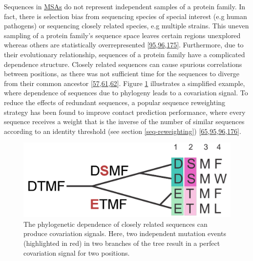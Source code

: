 \documentclass[11pt,a4paper,twoside]{book}
\theoremstyle{definition}
\theoremstyle{definition}
\theoremstyle{remark}
\begin{document}
Sequences in \protect\hyperlink{abbrev}{MSAs} do not represent
independent samples of a protein family. In fact, there is selection
bias from sequencing species of special interest (e.g human pathogens)
or sequencing closely related species, e.g multiple strains. This uneven
sampling of a protein family's sequence space leaves certain regions
unexplored whereas others are statistically overrepresented
{[}\protect\hyperlink{ref-Morcos2011}{95},\protect\hyperlink{ref-Cocco2017}{96},\protect\hyperlink{ref-Marks2012}{175}{]}.
Furthermore, due to their evolutionary relationship, sequences of a
protein family have a complicated dependence structure. Closely related
sequences can cause spurious correlations between positions, as there
was not sufficient time for the sequences to diverge from their common
ancestor
{[}\protect\hyperlink{ref-Gouveia_Oliveira2007}{57},\protect\hyperlink{ref-Lapedes1999}{61},\protect\hyperlink{ref-Burger2010}{62}{]}.
Figure \ref{fig:phylogenetic-effect} illustrates a simplified example,
where dependence of sequences due to phylogeny leads to a covariation
signal. To reduce the effects of redundant sequences, a popular sequence
reweighting strategy has been found to improve contact prediction
performance, where every sequence receives a weight that is the inverse
of the number of similar sequences according to an identity threshold
(see section \ref{seq-reweighting})
{[}\protect\hyperlink{ref-Jones2012}{65},\protect\hyperlink{ref-Morcos2011}{95},\protect\hyperlink{ref-Cocco2017}{96},\protect\hyperlink{ref-Buslje2009}{176}{]}.






\begin{figure}

{\centering \includegraphics[width=0.6\linewidth]{img/intro/phylogenetic_effect} 

}

\caption{The phylogenetic dependence of closely
related sequences can produce covariation signals. Here, two independent
mutation events (highlighted in red) in two branches of the tree result
in a perfect covariation signal for two positions.}\label{fig:phylogenetic-effect}
\end{figure}
\end{document}
